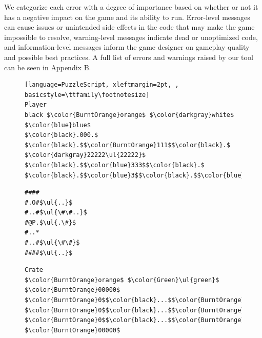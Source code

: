 We categorize each error with a degree of importance based on whether or not it has a negative impact on the game and its ability to run. Error-level messages can cause issues or unintended side effects in the code that may make the game impossible to resolve, warning-level messages indicate dead or unoptimized code, and information-level messages inform the game designer on gameplay quality and possible best practices. A full list of errors and warnings raised by our tool can be seen in Appendix B. 

\begin{figure}
\vspace*{-4pt}
%
%
%
\begin{minipage}{0.32\columnwidth}
\begin{lstlisting}[language=PuzzleScript, xleftmargin=2pt, , basicstyle=\ttfamily\footnotesize]
Player
black $\color{BurntOrange}orange$ $\color{darkgray}white$ $\color{blue}blue$
$\color{black}.000.$
$\color{black}.$$\color{BurntOrange}111$$\color{black}.$
$\color{darkgray}22222\ul{22222}$
$\color{black}.$$\color{blue}333$$\color{black}.$
$\color{black}.$$\color{blue}3$$\color{black}.$$\color{blue}3$$\color{black}.$
\end{lstlisting}
\end{minipage}
\hspace{12pt}
%
\begin{minipage}{0.31\columnwidth}
\begin{lstlisting}[language=PuzzleScript, xleftmargin=4pt,  basicstyle=\ttfamily\footnotesize]
####
#.O#$\ul{..}$
#..#$\ul{\#\#..}$
#@P.$\ul{.\#}$
#..*
#..#$\ul{\#\#}$
####$\ul{..}$
\end{lstlisting}
\end{minipage}
\hspace{12pt}
\begin{minipage}{0.28\columnwidth}
\begin{lstlisting}[language=PuzzleScript, xleftmargin=4pt, basicstyle=\ttfamily\footnotesize]
Crate
$\color{BurntOrange}orange$ $\color{Green}\ul{green}$
$\color{BurntOrange}00000$
$\color{BurntOrange}0$$\color{black}...$$\color{BurntOrange}0$
$\color{BurntOrange}0$$\color{black}...$$\color{BurntOrange}0$
$\color{BurntOrange}0$$\color{black}...$$\color{BurntOrange}0$
$\color{BurntOrange}00000$
\end{lstlisting}
\end{minipage}
\medskip


\end{figure}
